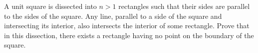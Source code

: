 A unit square is dissected into $n > 1$ rectangles such that their sides are parallel to the sides of the square. Any line, parallel to a side of the square and intersecting its interior, also intersects the interior of some rectangle. Prove that in this dissection, there exists a rectangle having no point on the boundary of the square.
